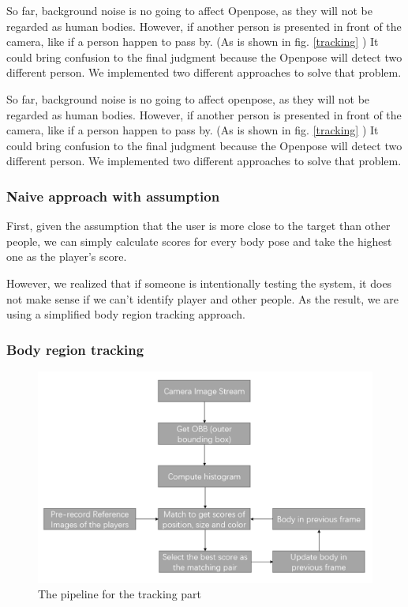 \documentclass[11pt,twocolumn,letterpaper]{article}
\begin{document}
So far, background noise is no going to affect Openpose, as they will not be regarded as human bodies. However, if another person is presented in front of the camera, like if a person happen to pass by. (As is shown in fig. \ref{tracking} ) It could bring confusion to the final judgment because the Openpose will detect two different person. We implemented two different approaches to solve that problem.

So far, background noise is no going to affect openpose, as they will not be regarded as human bodies. However, if another person is presented in front of the camera, like if a person happen to pass by. (As is shown in fig. \ref{tracking} ) It could bring confusion to the final judgment because the Openpose will detect two different person. We implemented two different approaches to solve that problem.

\subsubsection {Naive approach with assumption}
\par
First, given the assumption that the user is more close to the target than other people, we can simply calculate scores for every body pose and take the highest one as the player's score.
\par
However, we realized that if someone is intentionally testing the system, it does not make sense if we can't identify player and other people. As the result, we are using a simplified body region tracking approach.
\subsubsection{Body region tracking}
      \begin{figure}[h]
      \centering
      \includegraphics[width=\linewidth]{./Pic/tracking-pipeline.png}
      \caption{The pipeline for the tracking part}
      \end{figure}
\par
\end{document}
